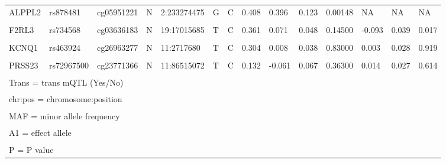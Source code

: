 \documentclass[11pt,twoside]{bristolthesis}
\begin{document}
\begin{table}[!h]
{\begin{tabular}[t]{llllllllllllll}
\addlinespace
ALPPL2 & rs878481 & cg05951221 & N & 2:233274475 & G & C & 0.408 & 0.396 & 0.123 & 0.00148 & NA & NA & NA\\
\cellcolor{gray!6}{ALPPL2} & \cellcolor{gray!6}{rs3748971} & \cellcolor{gray!6}{cg21566642} & \cellcolor{gray!6}{N} & \cellcolor{gray!6}{2:233285872} & \cellcolor{gray!6}{T} & \cellcolor{gray!6}{C} & \cellcolor{gray!6}{0.074} & \cellcolor{gray!6}{0.257} & \cellcolor{gray!6}{0.065} & \cellcolor{gray!6}{0.00011} & \cellcolor{gray!6}{NA} & \cellcolor{gray!6}{NA} & \cellcolor{gray!6}{NA}\\
F2RL3 & rs734568 & cg03636183 & N & 19:17015685 & T & C & 0.361 & 0.071 & 0.048 & 0.14500 & -0.093 & 0.039 & 0.017\\
\cellcolor{gray!6}{GFI1} & \cellcolor{gray!6}{rs17518433} & \cellcolor{gray!6}{cg09935388} & \cellcolor{gray!6}{N} & \cellcolor{gray!6}{1:92599172} & \cellcolor{gray!6}{A} & \cellcolor{gray!6}{T} & \cellcolor{gray!6}{0.236} & \cellcolor{gray!6}{0.114} & \cellcolor{gray!6}{0.052} & \cellcolor{gray!6}{0.03130} & \cellcolor{gray!6}{-0.001} & \cellcolor{gray!6}{0.036} & \cellcolor{gray!6}{0.986}\\
KCNQ1 & rs463924 & cg26963277 & N & 11:2717680 & T & C & 0.304 & 0.008 & 0.038 & 0.83000 & 0.003 & 0.028 & 0.919\\
\addlinespace
\cellcolor{gray!6}{PRSS23} & \cellcolor{gray!6}{rs1939110} & \cellcolor{gray!6}{cg11660018} & \cellcolor{gray!6}{N} & \cellcolor{gray!6}{11:86505120} & \cellcolor{gray!6}{T} & \cellcolor{gray!6}{C} & \cellcolor{gray!6}{0.286} & \cellcolor{gray!6}{-0.151} & \cellcolor{gray!6}{0.092} & \cellcolor{gray!6}{0.10100} & \cellcolor{gray!6}{0.026} & \cellcolor{gray!6}{0.042} & \cellcolor{gray!6}{0.534}\\
PRSS23 & rs72967500 & cg23771366 & N & 11:86515072 & T & C & 0.132 & -0.061 & 0.067 & 0.36300 & 0.014 & 0.027 & 0.614\\
\bottomrule
\multicolumn{14}{l}{\textsuperscript{} Trans = trans mQTL (Yes/No)}\\
\multicolumn{14}{l}{\textsuperscript{} chr:pos = chromosome:position}\\
\multicolumn{14}{l}{\textsuperscript{} MAF = minor allele frequency}\\
\multicolumn{14}{l}{\textsuperscript{} A1 = effect allele}\\
\multicolumn{14}{l}{\textsuperscript{} P = P value}\\
\end{tabular}}
\end{table}
\pagebreak
\end{document}

